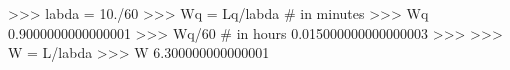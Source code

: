 
>>> labda = 10./60
>>> Wq = Lq/labda # in minutes
>>> Wq
0.9000000000000001
>>> Wq/60 # in hours
0.015000000000000003
>>>
>>> W = L/labda
>>> W
6.300000000000001

